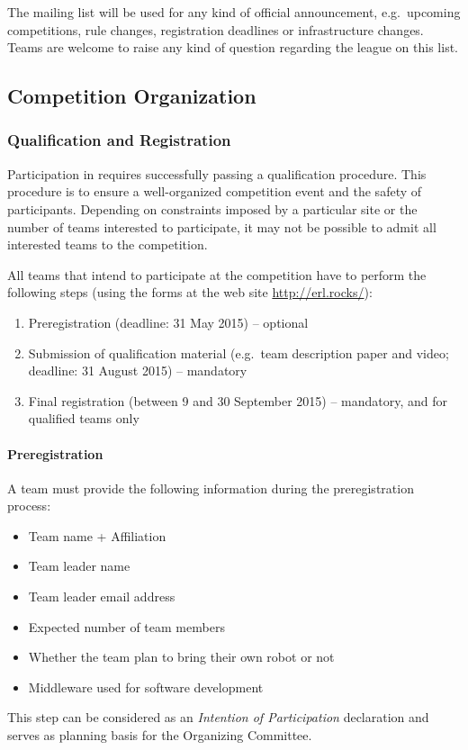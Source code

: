 The mailing list will be used for any kind of official announcement, e.g.~upcoming \erlir competitions, rule changes, registration deadlines or infrastructure changes. Teams are welcome to raise any kind of question regarding the league on this list.

\subsection{\erlir Competition Organization}
\label{ssec:CompOrg}

\subsubsection{Qualification and Registration}
\label{sssec:CompQualReg}

Participation in \erlir requires successfully passing a qualification procedure. This procedure is to ensure a well-organized competition event and the safety of participants.
Depending on constraints imposed by a particular site or the number of teams interested to participate, it may not be possible to admit all interested teams to the competition.

All teams that intend to participate at the competition have to perform the following steps (using the forms at the web site \url{http://erl.rocks/}):
%
\begin{enumerate}	\topsep-12pt\itemsep-2pt
	\item Preregistration (deadline: 31 May 2015) -- optional
	\item Submission of qualification material (e.g.~team description paper and video; deadline: 31 August 2015) -- mandatory
	\item Final registration (between 9 and 30 September 2015) -- mandatory, and for qualified teams only
\end{enumerate} 

\paragraph{Preregistration}
\label{par:CompPreregistration}

A team must provide the following information during the preregistration process:
%
\begin{itemize}	\topsep-12pt\itemsep-2pt
	\item Team name + Affiliation
	\item Team leader name
	\item Team leader email address
	\item Expected number of team members
	\item Whether the team plan to bring their own robot or not
	\item Middleware used for software development
\end{itemize}
%
This step can be considered as an \emph{Intention of Participation} declaration and serves as planning basis for the Organizing Committee.

